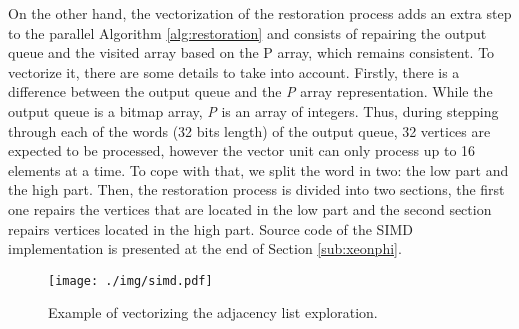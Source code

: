 \documentclass{sig-alternate-05-2015}
\begin{document}
On the other hand, the vectorization of the restoration process adds an extra step to the parallel Algorithm \ref{alg:restoration} and consists of repairing the output queue and the visited array based on the P array, which remains consistent. To vectorize it, there are some details to take into account. Firstly, there is a difference between the output queue and the \textit{P} array representation. While the output queue is a bitmap array, \textit{P} is an array of integers. Thus, during stepping through each of the words (32 bits length) of the output queue, 32 vertices are expected to be processed, however the vector unit can only process up to 16 elements at a time. To cope with that, we split the word in two: the low part and the high part. Then, the restoration process is divided into two sections, the first one repairs the vertices that are located in the low part and the second section repairs vertices located in the high part. Source code of the SIMD implementation is presented at the end of Section \ref{sub:xeonphi}. 




\begin{figure}
\centering
\texttt{[image: ./img/simd.pdf]}
\caption{Example of vectorizing the adjacency list exploration.}
\label{fig:simdlane}
\vspace{-3mm}
\end{figure}
\end{document}
